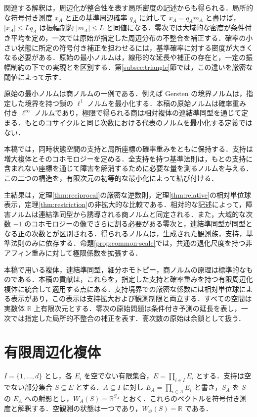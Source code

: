 \documentclass[11pt,a4paper]{article}
\numberwithin{equation}{section}
\theoremstyle{japanese}
\theoremstyle{remark}
\newcommand{\R}{\mathbb R}
\begin{document}
関連する解釈は，周辺化が整合性を表す局所密度の記述からも得られる\cite[Definition~7]{Peltre}．局所的な符号付き測度 $x_A$ と正の基準周辺確率 $q_A$ に対して $x_A=q_A m_A$ と書けば，$|x_A|\le Lq_A$ は振幅制約 $|m_A|\le L$ と同値になる．零次では大域的な密度が条件付き平均を定め，一次では原始が指定した周辺分布の不整合を補正する．確率の小さい状態に所定の符号付き補正を担わせるには，基準確率に対する密度が大きくなる必要がある．原始の最小ノルムは，線形的な延長や補正の存在と，一定の振幅制約の下での実現とを区別する．第\ref{subsec:triangle}節では，この違いを厳密な閾値によって示す．

原始の最小ノルムは商ノルムの一例である．例えば Gersten の境界ノルムは，指定した境界を持つ鎖の $\ell^1$ ノルムを最小化する\cite[Definition~2.53 and Remark~2.54]{Calegari}．本稿の原始ノルムは確率重み付き $\ell^\infty$ ノルムであり，極限で得られる商は相対複体の連結準同型を通じて定まる．もとのコサイクルと同じ次数における代表のノルムを最小化する定義ではない．

本稿では，同時状態空間の支持と局所座標の確率重みをともに保持する．支持は増大複体とそのコホモロジーを定める．全支持を持つ基準法則は，もとの支持に含まれない座標を通じて障害を解消するために必要な量を測るノルムを与える．この二つの構造を，有限次元の初等的な最小化によって結び付ける．

主結果は，定理\ref{thm:reciprocal}の厳密な逆数則，定理\ref{thm:relative}の相対単位球表示，定理\ref{thm:restriction}の非拡大的な比較である．相対的な記述によって，障害ノルムは連結準同型から誘導される商ノルムと同定される．また，大域的な次数 $-1$ のコホモロジーの像でさらに割る必要がある零次と，連結準同型が同型となる正の次数とが区別される．得られるノルムは，生成された観測族，支持，基準法則のみに依存する．命題\ref{prop:common-scale}では，共通の退化尺度を持つ非アフィン重みに対して極限係数を拡張する．

本稿で用いる複体，連結準同型，細分ホモトピー，商ノルムの原理は標準的なものである．本稿の貢献は，これらを，指定した支持と確率重みを持つ有限周辺化複体に統合して適用する点にある．支持境界での厳密な係数には相対単位球による表示があり，この表示は支持拡大および観測制限と両立する．すべての空間は実数体 $\R$ 上有限次元とする．零次の原始問題は条件付き予測の延長を表し，一次では指定した局所的不整合の補正を表す．高次数の原始は余鎖として扱う．

\section{有限周辺化複体}\label{sec:complex}
$I=\{1,\ldots,d\}$ とし，各 $E_i$ を空でない有限集合，$E=\prod_{i\in I}E_i$ とする．支持は空でない部分集合 $S\subseteq E$ とする．$A\subseteq I$ に対し $E_A=\prod_{i\in A}E_i$ と書き，$S_A$ を $S$ の $E_A$ への射影とし，$W_A(S)=\R^{S_A}$ とおく．これらのベクトルを符号付き測度と解釈する．空観測の状態は一つであり，$W_\varnothing(S)=\R$ である．
\end{document}
